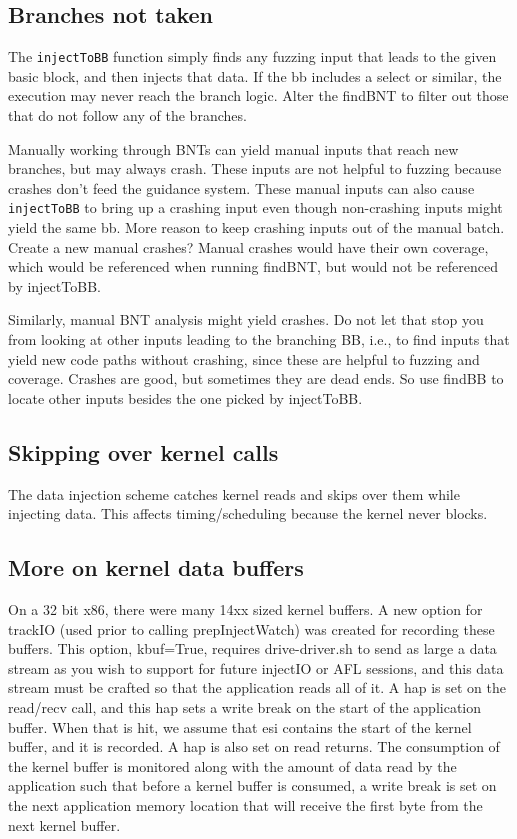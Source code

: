 \documentclass[titlepage]{article}
\begin{document}
\begin{appendices}
\subsection{Branches not taken}
The {\tt injectToBB} function simply finds any fuzzing input that leads to the given basic block, and then injects that data.
If the bb includes a select or similar, the execution may never reach the branch logic.  Alter the findBNT to filter out those that do not
follow any of the branches.

Manually working through BNTs can yield manual inputs that reach new branches, but may always crash.  These inputs are not helpful to fuzzing because crashes don't 
feed the guidance system.  These manual inputs can also cause {\tt injectToBB} to bring up a crashing input even though non-crashing inputs might yield the same bb.
More reason to keep crashing inputs out of the manual batch.  Create a new manual crashes?  Manual crashes would have their own coverage, which would be referenced
when running findBNT, but would not be referenced by injectToBB.

Similarly, manual BNT analysis might yield crashes.  Do not let that stop you from looking at other inputs leading to the branching BB, i.e., to find inputs that
yield new code paths without crashing, since these are helpful to fuzzing and coverage.  Crashes are good, but sometimes they are dead ends.  So use findBB to locate other
inputs besides the one picked by injectToBB.


\subsection{Skipping over kernel calls}
The data injection scheme catches kernel reads and skips over them while injecting data.  This affects timing/scheduling because the kernel never
blocks.

\subsection{More on kernel data buffers}
On a 32 bit x86, there were many 14xx sized kernel buffers.  A new option for trackIO (used prior to calling prepInjectWatch) was created for recording these buffers.
This option, kbuf=True, requires drive-driver.sh to send as large a data stream as you wish to support for future injectIO or AFL sessions, and this data stream
must be crafted so that the application reads all of it.  A hap is set on the read/recv call, and this hap sets a write break on the start of the application buffer.  When that is hit, we assume that esi contains the start of the kernel buffer, and it is recorded.  A hap is also set on read returns.  The consumption of the
kernel buffer is monitored along with the amount of data read by the application such that before a kernel buffer is consumed, a write break is set on the next 
application memory location that will receive the first byte from the next kernel buffer.


\end{appendices}
\end{document}
